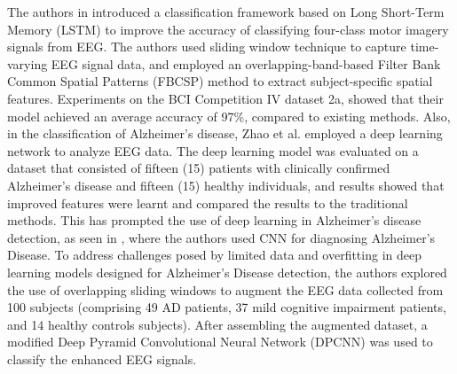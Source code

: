 \documentclass[preprint,12pt]{elsarticle}
\begin{document}
The authors in \citep{hwang_improving_2023} introduced a classification framework based on Long Short-Term Memory (LSTM) to improve the accuracy of classifying four-class motor imagery signals from EEG. The authors used sliding window technique to capture time-varying EEG signal data, and employed an overlapping-band-based Filter Bank Common Spatial Patterns (FBCSP) method to extract subject-specific spatial features. Experiments on the BCI Competition IV dataset 2a, showed that their model achieved an average accuracy of 97\%, compared to existing methods. Also, in the classification of Alzheimer's disease, Zhao et al. \citep{zhao_deep_2015} employed a deep learning network to analyze EEG data. The deep learning model was evaluated on a dataset that consisted of fifteen (15) patients with clinically confirmed Alzheimer's disease and fifteen (15) healthy individuals, and results showed that improved features were learnt and compared the results to the traditional methods. This has prompted the use of deep learning in Alzheimer's disease detection, as seen in \citep{xia_novel_2023}, where the authors used CNN for diagnosing Alzheimer's Disease. To address challenges posed by limited data and overfitting in deep learning models designed for Alzheimer's Disease detection, the authors explored the use of overlapping sliding windows to augment the EEG data collected from 100 subjects (comprising 49 AD patients, 37 mild cognitive impairment patients, and 14 healthy controls subjects). After assembling the augmented dataset, a modified Deep Pyramid Convolutional Neural Network (DPCNN) was used to classify the enhanced EEG signals. 
\end{document}
